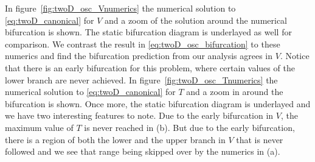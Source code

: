 In figure~\ref{fig:twoD_osc_Vnumerics} the numerical solution to \eqref{eq:twoD_canonical} for $V$ and a zoom of the solution around the numerical bifurcation is shown. The static bifurcation diagram is underlayed as well for comparison. We contrast the result in \eqref{eq:twoD_osc_bifurcation} to these numerics and find the bifurcation prediction from our analysis agrees in $V$. Notice that there is an early bifurcation for this problem, where certain values of the lower branch are never achieved.
In figure~\ref{fig:twoD_osc_Tnumerics} the numerical solution to \eqref{eq:twoD_canonical} for $T$ and a zoom in around the bifurcation is shown. Once more, the static bifurcation diagram is underlayed and we have two interesting features to note. Due to the early bifurcation in $V$, the maximum value of $T$ is never reached in (b). But due to the early bifurcation, there is a region of both the lower and the upper branch in $V$ that is never followed and we see that range being skipped over by the numerics in (a).

